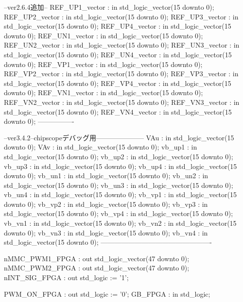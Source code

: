 \begin{mylisting}[language=VHDL,caption=ゲート信号出力モジュール,label=MMC_PWM_GEN_module_VHDL]
		--ver2.6.4追加--
		REF_UP1_vector	: in std_logic_vector(15 downto 0);
		REF_UP2_vector	: in std_logic_vector(15 downto 0);
		REF_UP3_vector	: in std_logic_vector(15 downto 0);
		REF_UP4_vector	: in std_logic_vector(15 downto 0);
		REF_UN1_vector	: in std_logic_vector(15 downto 0);
		REF_UN2_vector	: in std_logic_vector(15 downto 0);
		REF_UN3_vector	: in std_logic_vector(15 downto 0);
		REF_UN4_vector	: in std_logic_vector(15 downto 0);
		REF_VP1_vector	: in std_logic_vector(15 downto 0);
		REF_VP2_vector	: in std_logic_vector(15 downto 0);
		REF_VP3_vector	: in std_logic_vector(15 downto 0);
		REF_VP4_vector	: in std_logic_vector(15 downto 0);
		REF_VN1_vector	: in std_logic_vector(15 downto 0);
		REF_VN2_vector	: in std_logic_vector(15 downto 0);
		REF_VN3_vector	: in std_logic_vector(15 downto 0);
		REF_VN4_vector	: in std_logic_vector(15 downto 0);
		----------------
		
		--ver3.4.2--chipscopeデバッグ用---------------------
		VAu 	  : in std_logic_vector(15 downto 0);
		VAv 	  : in std_logic_vector(15 downto 0);
		vb_up1  : in std_logic_vector(15 downto 0);
		vb_up2  : in std_logic_vector(15 downto 0);
		vb_up3  : in std_logic_vector(15 downto 0);
		vb_up4  : in std_logic_vector(15 downto 0);
		vb_un1  : in std_logic_vector(15 downto 0);
		vb_un2  : in std_logic_vector(15 downto 0);
		vb_un3  : in std_logic_vector(15 downto 0);
		vb_un4  : in std_logic_vector(15 downto 0);
		vb_vp1  : in std_logic_vector(15 downto 0);
		vb_vp2  : in std_logic_vector(15 downto 0);
		vb_vp3  : in std_logic_vector(15 downto 0);
		vb_vp4  : in std_logic_vector(15 downto 0);
		vb_vn1  : in std_logic_vector(15 downto 0);
		vb_vn2  : in std_logic_vector(15 downto 0);
		vb_vn3  : in std_logic_vector(15 downto 0);
		vb_vn4  : in std_logic_vector(15 downto 0);
		-------------------------------------------------
		
		nMMC_PWM1_FPGA	: out	std_logic_vector(47 downto 0);
		nMMC_PWM2_FPGA	: out	std_logic_vector(47 downto 0);
		nINT_SIG_FPGA	: out	std_logic := '1';
		
		PWM_ON_FPGA		: out	std_logic := '0';
		GB_FPGA			: in	std_logic;
		

\end{mylisting}
